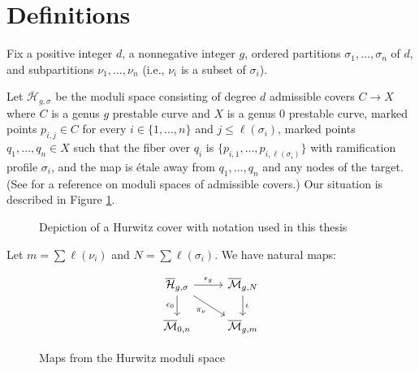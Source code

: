 \documentclass[thesis]{thesis-umich}           %
\newcommand{\Hb}{\overline{\mathcal H}}
\theoremstyle{definition}
\begin{document}
\section{Definitions}
Fix a positive integer $d$, a nonnegative integer $g$, ordered partitions $\sigma_1,\dots,\sigma_n$ of $d$, and subpartitions $\nu_1,\dots,\nu_n$ (i.e., $\nu_i$ is a subset of $\sigma_i$).

Let $\Hb_{g,\sigma}$ be the moduli space consisting of degree $d$ admissible covers $C\to X$ where $C$ is a genus $g$ prestable curve and $X$ is a genus $0$ prestable curve, marked points $p_{i,j}\in C$ for every $i\in\{1,\dots,n\}$ and
$j\leq \ell(\sigma_i)$, 
marked points $q_1,\dots,q_n\in X$ such that
the fiber over $q_i$ is $\{p_{i,1},\dots,p_{i,\ell(\sigma_i)}\}$ with
ramification profile $\sigma_i$, and the map is \'etale away from $q_1,\dots,q_n$ and any nodes of the target. (See \cite{Admissible} for a reference on moduli spaces of admissible covers.) Our situation is described in Figure \ref{fig:hurwitz}.

\begin{figure}[h]
  \caption{Depiction of a Hurwitz cover with notation used in this thesis}
  \centering
{}

\label{fig:hurwitz}
\end{figure}



Let $m=\sum\ell(\nu_i)$ and $N=\sum\ell(\sigma_i)$.
We have natural maps:
~\\
\begin{figure}[h]
  \caption{Maps from the Hurwitz moduli space}
  \centering
  \[\begin{tikzcd}
	{\overline{\mathcal H}_{g,\sigma}} & {\overline{\mathcal M}_{g,N}} \\
	{\overline{\mathcal M}_{0,n}} & {\overline{\mathcal M}_{g,m}}
	\arrow["{\epsilon_g}", from=1-1, to=1-2]
	\arrow["{\epsilon_0}"', from=1-1, to=2-1]
	\arrow["{\pi_{\nu}}"', from=1-1, to=2-2]
	\arrow["\iota", from=1-2, to=2-2]
\end{tikzcd}\]
\label{fig:maps}
\end{figure}
\end{document}
